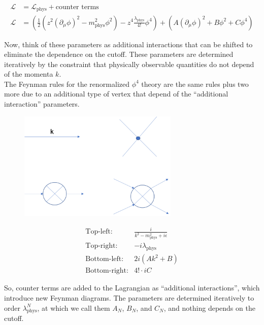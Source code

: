 \begin{align}
\mathcal{L} &= \mathcal{L}_{\text{phys}} + \text{counter terms} \\
\mathcal{L} &= \left(\frac{1}{2} (z^2 (\partial_\mu \phi)^2 - m_{\text{phys}}^2 \phi^2 ) - z^4 \frac{\lambda_{\text{phys}}}{4!} \phi^4 \right) + \left( A (\partial_\mu \phi )^2 + B \phi^2 + C \phi^4  \right)
\end{align}

\noindent Now, think of these parameters as additional interactions that can be shifted to eliminate the dependence on the cutoff. These parameters are determined iteratively by the constraint that physically observable quantities do not depend of the momenta $k$. \\

\noindent The Feynman rules for the renormalized $\phi^4$ theory are the same rules plus two more due to an additional type of vertex that depend of the ``additional interaction'' parameters.

\begin{figure}[H]
	\centering
	\includegraphics[width=3in]{images/renorm_feynman.png}
\end{figure}

$$
\begin{array}{lc}
\text{Top-left:} & \frac{i}{k^2 - m_{\text{phys}}^2 + i \epsilon} \\
\text{Top-right: }& -i \lambda_{\text{phys}} \\
\text{Bottom-left:} & 2 i (A k^2 + B) \\
\text{Bottom-right:} & 4! \cdot i C
\end{array}
$$

\noindent So, counter terms are added to the Lagrangian as ``additional interactions'', which introduce new Feynman diagrams. The parameters are determined iteratively to order $\lambda_{\text{phys}}^N$, at which we call them $A_N$, $B_N$, and $C_N$, and nothing depends on the cutoff. \\

